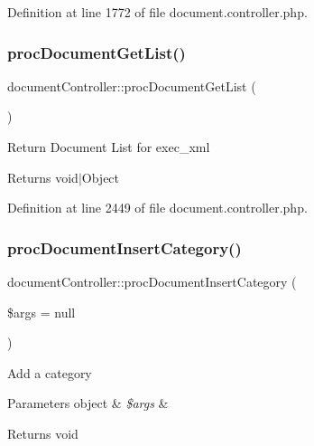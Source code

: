 Definition at line 1772 of file document.\+controller.\+php.

\mbox{\label{classdocumentController_a23cf92fe7c204813d12c5996360cd939}} 
\subsubsection{\texorpdfstring{proc\+Document\+Get\+List()}{procDocumentGetList()}}
{\footnotesize\ttfamily document\+Controller\+::proc\+Document\+Get\+List (\begin{DoxyParamCaption}{ }\end{DoxyParamCaption})}

Return Document List for exec\+\_\+xml \begin{DoxyReturn}{Returns}
void$\vert$\+Object 
\end{DoxyReturn}


Definition at line 2449 of file document.\+controller.\+php.

\mbox{\label{classdocumentController_aad9894e1432083a62a883568c7b3a42b}} 
\subsubsection{\texorpdfstring{proc\+Document\+Insert\+Category()}{procDocumentInsertCategory()}}
{\footnotesize\ttfamily document\+Controller\+::proc\+Document\+Insert\+Category (\begin{DoxyParamCaption}\item[{}]{\$args = {\ttfamily null} }\end{DoxyParamCaption})}

Add a category 
\begin{DoxyParams}[1]{Parameters}
object & {\em \$args} & \\
\hline
\end{DoxyParams}
\begin{DoxyReturn}{Returns}
void 
\end{DoxyReturn}


